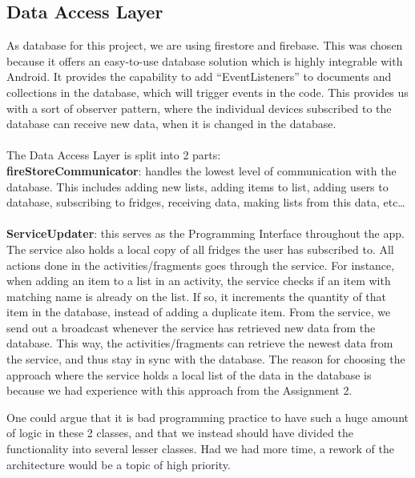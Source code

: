 \documentclass[12pt]{article}
\begin{document}
\subsection{Data Access Layer}
As database for this project, we are using firestore and firebase. This was chosen because it offers an easy-to-use database solution which is highly integrable with Android. It provides the capability to add “EventListeners” to documents and collections in the database, which will trigger events in the code. This provides us with a sort of observer pattern, where the individual devices subscribed to the database can receive new data, when it is changed in the database.
\\
\\
The Data Access Layer is split into 2 parts:\\ \textbf{fireStoreCommunicator}: handles the lowest level of communication with the database. This includes adding new lists, adding items to list, adding users to database, subscribing to fridges, receiving data, making lists from this data, etc…
\\
\\
\textbf{ServiceUpdater}: this serves as the Programming Interface throughout the app. The service also holds a local copy of all fridges the user has subscribed to. All actions done in the activities/fragments goes through the service. For instance, when adding an item to a list in an activity, the service checks if an item with matching name is already on the list. If so, it increments the quantity of that item in the database, instead of adding a duplicate item.
From the service, we send out a broadcast whenever the service has retrieved new data from the database. This way, the activities/fragments can retrieve the newest data from the service, and thus stay in sync with the database.
The reason for choosing the approach where the service holds a local list of the data in the database is because we had experience with this approach from the Assignment 2.

One could argue that it is bad programming practice to have such a huge amount of logic in these 2 classes, and that we instead should have divided the functionality into several lesser classes. Had we had more time, a rework of the architecture would be a topic of high priority.
\end{document}
